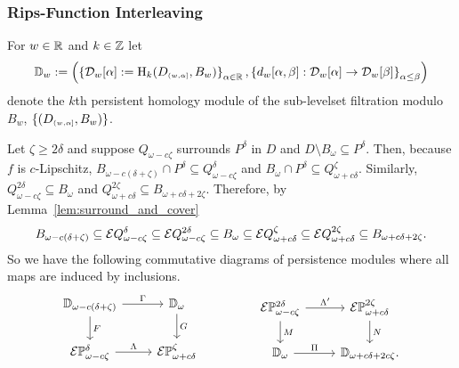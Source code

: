 
\subsubsection{Rips-Function Interleaving}

For $w\in\mathbb{R}$ and $k\in\mathbb{Z}$ let
\[ \mathbb{D}_{w} := \left(\left\{\mathcal{D}_{w}[\alpha] := \mathrm{H}_k(D_{\scriptscriptstyle (w,\alpha]},B_w)\right\}_{\alpha\in\mathbb{R}},\left\{d_w[\alpha,\beta] : \mathcal{D}_{w}[\alpha]\to\mathcal{D}_{w}[\beta]\right\}_{\alpha\leq\beta}\right)\]
denote the $k$th persistent homology module of the sub-levelset filtration modulo $B_w$, $\{(D_{\scriptscriptstyle (w,\alpha]},B_w)\}$.

Let $\zeta\geq 2\delta$ and suppose $Q_{\omega-c\zeta}$ surrounds $P^\delta$ in $D$ and $D\setminus B_\omega\subseteq P^\delta$.
Then, because $f$ is $c$-Lipschitz, $B_{\omega-c(\delta+\zeta)}\cap P^\delta\subseteq Q_{\omega-c\zeta}^\delta$ and $B_\omega\cap P^\delta\subseteq Q_{\omega+c\delta}^\zeta$.
Similarly, $Q_{\omega-c\zeta}^{2\delta}\subseteq B_\omega$ and $Q_{\omega+c\delta}^{2\zeta}\subseteq B_{\omega+c{\delta+2\zeta}}$.
Therefore, by Lemma~\ref{lem:surround_and_cover}
\[ B_{\omega-c(\delta+\zeta)}\subseteq \mathcal{E} Q_{\omega-c\zeta}^\delta\subseteq\mathcal{E} Q_{\omega-c\zeta}^{2\delta}\subseteq B_\omega
  \subseteq \mathcal{E} Q_{\omega+c\delta}^\zeta\subseteq \mathcal{E} Q_{\omega+c\delta}^{2\zeta}\subseteq B_{\omega+c{\delta+2\zeta}}.\]
So we have the following commutative diagrams of persistence modules where all maps are induced by inclusions.
\[\begin{tikzcd}
    \DD{\omega-c(\delta+\zeta)} \arrow{r}{\Gamma}\arrow{d}{F} &
    \DD{\omega} \arrow{d}{G}\\
    \E\PP{\omega-c\zeta}{\delta}\arrow{r}{\Lambda} &
    \E\PP{\omega+c\delta}{\zeta}
  \end{tikzcd}\hspace{10ex}
  \begin{tikzcd}
    \E\PP{\omega-c\zeta}{2\delta} \arrow{r}{\Lambda'}\arrow{d}{M} &
    \E\PP{\omega+c\delta}{2\zeta}\arrow{d}{N}\\
    \DD{\omega} \arrow{r}{\Pi} &
    \DD{\omega+c{\delta+2c\zeta}}.
  \end{tikzcd}\]


